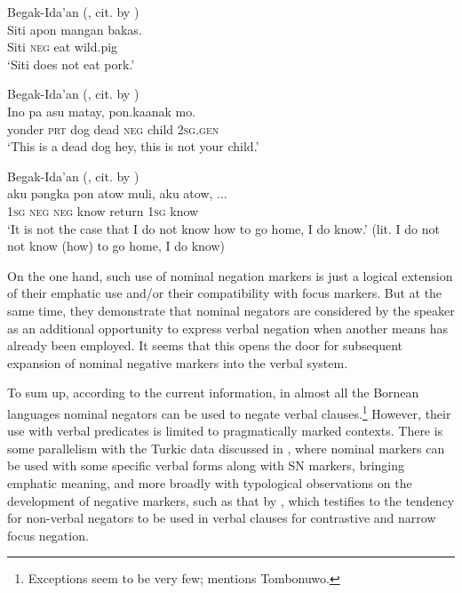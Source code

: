 \documentclass[output=paper]{langsci/langscibook}
\begin{document}
\ea Begak-Ida’an (\citealp[300]{goudswaard2005a}, cit. by \citealp[15]{kroeger2014a}) \label{ex:BK63}\\
	\gll Siti		apon	mangan	bakas.\\
	Siti		\textsc{neg}	eat		wild.pig\\
	\glt `Siti does not eat pork.'
\z

\ea Begak-Ida’an (\citealp[304]{goudswaard2005a}, cit. by \citealp[15]{kroeger2014a}) \label{ex:BK64}\\
	\gll Ino			pa		asu	matay,	pon.ka\footnotemark	anak	mo.\\
	yonder	\textsc{prt}	dog	dead		\textsc{neg}		child	\textsc{2sg.gen}\\
	\glt `This is a dead dog hey, this is not your child.'\footnotemark
\z



\ea Begak-Ida’an (\citealp[305]{goudswaard2005a}, cit. by \citealp[16]{kroeger2014a}) \label{ex:BK65}\\
	\gll aku	pǝngka	pon	atow		muli,		aku	atow, ...\\
	\textsc{1sg}	\textsc{neg}		\textsc{neg}	know		return	\textsc{1sg}	know\\
	\glt `It is not the case that I do not know how to go home, I do know.' (lit. I do not not know (how) to go home, I do know)
\z


On the one hand, such use of nominal negation markers is just a logical extension of their emphatic use and/or their compatibility with focus markers. But at the same time, they demonstrate that nominal negators are considered by the speaker as an additional opportunity to express verbal negation when another means has already been employed. It seems that this opens the door for subsequent expansion of nominal negative markers into the verbal system.

To sum up, according to the current information, in almost all the Bornean languages nominal negators can be used to negate verbal clauses.\footnote{Exceptions seem to be very few; \citet{kroeger2014a} mentions Tombonuwo.} However, their use with verbal predicates is limited to pragmatically marked contexts. There is some parallelism with the Turkic data discussed in , where nominal markers can be used with some specific verbal forms along with SN markers, bringing emphatic meaning, and more broadly with typological observations on the development of negative markers, such as that by \citet{Horn1989}, which testifies to the tendency for non-verbal negators to be used in verbal clauses for contrastive and narrow focus negation.
\end{document}
